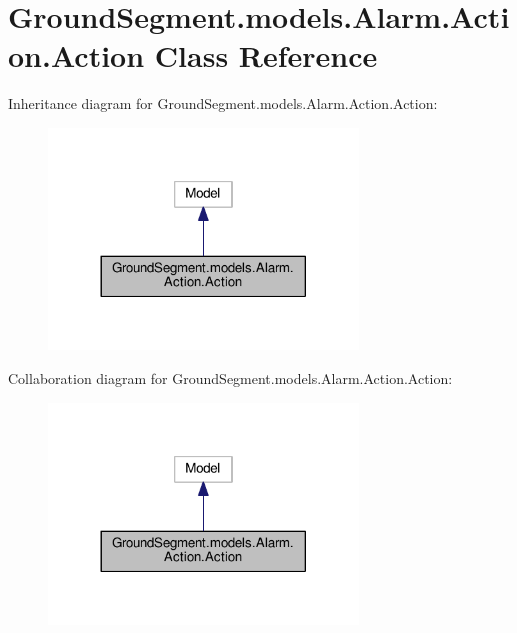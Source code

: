 \hypertarget{class_ground_segment_1_1models_1_1_alarm_1_1_action_1_1_action}{}\section{Ground\+Segment.\+models.\+Alarm.\+Action.\+Action Class Reference}
\label{class_ground_segment_1_1models_1_1_alarm_1_1_action_1_1_action}


Inheritance diagram for Ground\+Segment.\+models.\+Alarm.\+Action.\+Action\+:\nopagebreak
\begin{figure}[H]
\begin{center}
\leavevmode
\includegraphics[width=233pt]{class_ground_segment_1_1models_1_1_alarm_1_1_action_1_1_action__inherit__graph}
\end{center}
\end{figure}


Collaboration diagram for Ground\+Segment.\+models.\+Alarm.\+Action.\+Action\+:\nopagebreak
\begin{figure}[H]
\begin{center}
\leavevmode
\includegraphics[width=233pt]{class_ground_segment_1_1models_1_1_alarm_1_1_action_1_1_action__coll__graph}
\end{center}
\end{figure}


